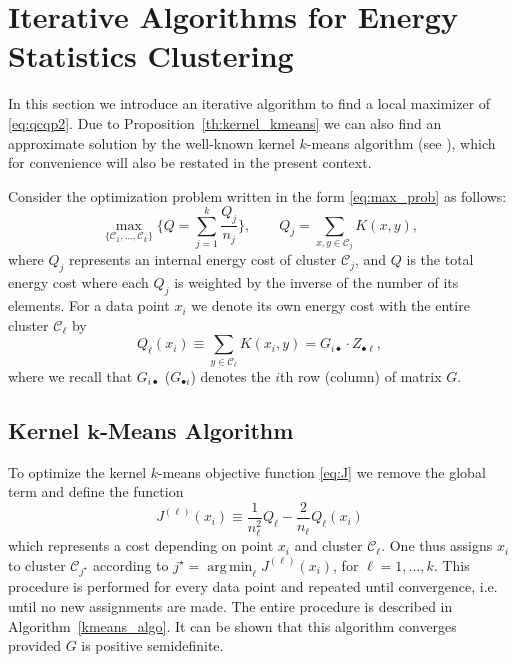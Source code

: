 \documentclass[aps,preprint,nofootinbib,floatfix]{revtex4-1}
\DeclareMathOperator*{\argmin}{arg\,min}
\newcommand\kk{K}
\newcommand\C{{\mathcal{C}}}
\begin{document}
\section{Iterative Algorithms for Energy Statistics Clustering}
\label{sec:algo}

In this section we introduce an iterative algorithm to find a local
maximizer of \eqref{eq:qcqp2}. Due to 
Proposition~\ref{th:kernel_kmeans} we can also find an approximate
solution by the well-known kernel $k$-means algorithm 
(see \cite{Dhillon2,Dhillon}), which 
for convenience will also be restated in the present context.

Consider the optimization problem 
written in the form \eqref{eq:max_prob} as follows:
\begin{equation}
\label{eq:maxQ}
\max_{\{ \C_1,\dotsc,\C_k \}} 
\bigg\{ Q = \sum_{j=1}^k \dfrac{Q_j}{n_j}  \bigg\},
\qquad Q_j = \sum_{x,y\in\C_j} \kk(x,y),
\end{equation}
where $Q_j$ represents an internal energy cost of cluster $\C_j$, and
$Q$ is the total energy cost where each $Q_j$ 
is weighted by the inverse
of the number of its elements. For a data point $x_i$ we denote
its own energy cost
with the entire cluster $\C_\ell$ by
\begin{equation}
\label{eq:costxij}
Q_\ell(x_i) \equiv \sum_{y\in\C_\ell} \kk(x_i, y) = 
G_{i \bullet} \cdot Z_{\bullet \ell},
\end{equation}
where we recall that $G_{i\bullet}$ ($G_{\bullet i}$) denotes
the $i$th row (column) of matrix $G$.

\subsection*{Kernel $\bm{k}$-Means Algorithm}

To optimize the kernel $k$-means objective function
\eqref{eq:J} we remove the global term and define the function
\begin{equation}
\label{eq:Jell}
J^{(\ell)}(x_i) \equiv 
\dfrac{1}{n_\ell^2} Q_\ell
-\dfrac{2}{n_\ell} Q_\ell(x_i) 
\end{equation}
which represents a cost depending on point $x_i$ and cluster $\C_\ell$. One
thus assigns  $x_i$ to cluster $\C_{j^\star}$ according
to $j^\star = \argmin_\ell J^{(\ell)}(x_i)$, for $\ell = 1,\dotsc,k$.
This procedure is performed for every data point and repeated until
convergence, i.e. until no new assignments are made.
The entire procedure is described in Algorithm~\ref{kmeans_algo}.
It can be shown that this algorithm converges provided $G$ is positive
semidefinite.
\end{document}
